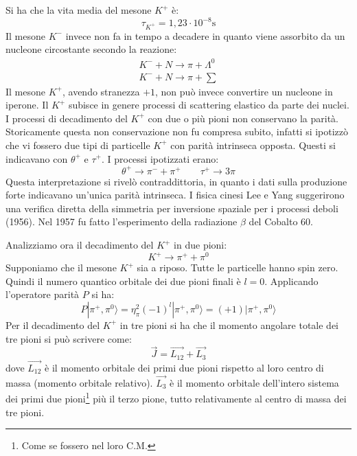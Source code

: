 Si ha che la vita media del mesone $K^+$ è:
\[
\tau_{K^+}=1,23\cdot 10^{-8}\si{\second}
\]
Il mesone $K^-$ invece non fa in tempo a decadere in quanto viene assorbito da un nucleone circostante secondo la reazione:
\begin{gather}
K^-+N\rightarrow \pi+\Lambda^0\\
K^-+N\rightarrow \pi+\sum
\end{gather}
Il mesone $K^+$, avendo stranezza $+1$, non può invece convertire un nucleone in iperone.
Il $K^+$ subisce in genere processi di scattering elastico da parte dei nuclei.
I processi di decadimento del $K^+$ con due o più pioni non conservano la parità.
Storicamente questa non conservazione non fu compresa subito, infatti si ipotizzò che vi fossero due tipi
di particelle $K^+$ con parità intrinseca opposta.
Questi si indicavano con $\theta^+$ e $\tau^+$. I processi ipotizzati erano:
\[
\theta^+\rightarrow \pi^-+\pi^+\qquad \tau^+\rightarrow 3\pi
\]
Questa interpretazione si rivelò contraddittoria, in quanto i dati sulla produzione forte indicavano un'unica
parità intrinseca. I fisica cinesi Lee e Yang suggerirono una verifica diretta della simmetria per inversione
spaziale per i processi deboli (1956).
Nel 1957 fu fatto l'esperimento della radiazione $\beta$ del Cobalto 60.

Analizziamo ora il decadimento del $K^+$ in due pioni:
\[
K^+\rightarrow \pi^++\pi^0
\]
Supponiamo che il mesone $K^+$ sia a riposo. Tutte le particelle hanno spin zero.
Quindi il numero quantico orbitale dei due pioni finali è $l=0$. Applicando l'operatore parità $P$ si ha:
\begin{equation}
P|\pi^+,\pi^0\rangle=\eta_{\pi}^2(-1)^l|\pi^+,\pi^0\rangle=(+1)|\pi^+,\pi^0\rangle
\end{equation}
Per il decadimento del $K^+$ in tre pioni si ha che il momento angolare totale dei tre pioni si può scrivere come:
\begin{equation}
\vec{J}=\vec{L_{12}}+\vec{L_3}
\end{equation}
dove $\vec{L_{12}}$ è il momento orbitale dei primi due pioni rispetto al loro centro di massa (momento orbitale relativo).
$\vec{L_3}$ è il momento orbitale dell'intero sistema dei primi due pioni\footnote{Come se fossero nel loro C.M.}
più il terzo pione, tutto relativamente al centro di massa dei tre pioni.

